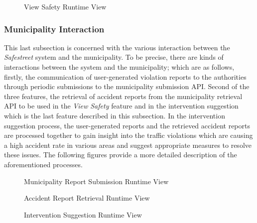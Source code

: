 \begin{figure}[H]
\caption{View Safety Runtime View}
\label{fig:RuntimeSafe}
\centering

\end{figure}

\subsubsection{Municipality Interaction}
This last subsection is concerned with the various interaction between the \emph{Safestreet} system and the municipality. To be precise, there are kinds of interactions between the system and the municipality; which are as follows, firstly, the communication of user-generated violation reports to the authorities through periodic submissions to the municipality submission API. Second of the three features, the retrieval of accident reports from the municipality retrieval API to be used in the \emph{View Safety} feature and in the intervention suggestion which is the last feature described in this subsection. In the intervention suggestion process, the user-generated reports and the retrieved accident reports are processed together to gain insight into the traffic violations which are causing a high accident rate in various areas and suggest appropriate measures to resolve these issues. The following figures provide a more detailed description of the aforementioned processes.

\begin{figure}[H]
\caption{Municipality Report Submission Runtime View}
\label{fig:RuntimeSub}
\centering

\end{figure}

\begin{figure}[H]
\caption{Accident Report Retrieval Runtime View}
\label{fig:RuntimeRet}
\centering

\end{figure}

\begin{figure}[H]
\caption{Intervention Suggestion Runtime View}
\label{fig:RuntimeInter}
\centering

\end{figure}
